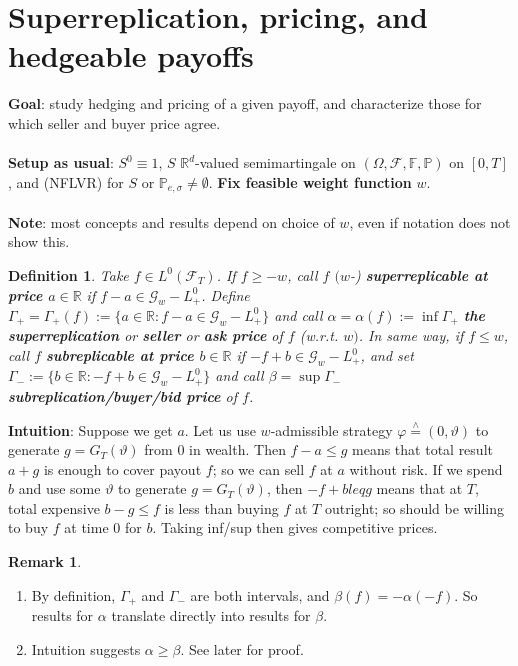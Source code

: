 \documentclass[12pt,a4paper, twoside]{article}
\newtheorem{defn}{Definition}[section]
\theoremstyle{definition}
\newtheorem{rem}{Remark}[section]
\newcommand{\PP}{\mathbb{P}} %
\newcommand{\teq}{\overset{\wedge}{=}}
\begin{document}
\section{Superreplication, pricing, and hedgeable payoffs}
\textbf{Goal}: study hedging and pricing of a given payoff, and characterize those for which seller and buyer price agree. 
\\\\
\textbf{Setup as usual}: $S^0 \equiv 1$, $S$ $\mathbb{R}^d$-valued semimartingale on $( \Omega, \mathcal{F}, \mathbb{F}, \PP)$ on $[0,T]$,  and (NFLVR) for $S$ or $\PP_{e, \sigma} \neq \emptyset$. \textbf{Fix feasible weight function} $w$.
\\\\
\textbf{Note}: most concepts and results depend on choice of $w$, even if notation does not show this. 
\begin{defn} Take $f \in L^0( \mathcal{F}_T)$. If $f \geq -w$, call $f$ $(w$-) \textbf{superreplicable at price $a \in \mathbb{R}$} if $f-a \in \mathcal{G}_w-L_+^0$. Define $\Gamma_+= \Gamma_+(f) := \{ a \in \mathbb{R}: f-a \in \mathcal{G}_w-L_+^0 \}$ and call $\alpha = \alpha(f) := \inf \Gamma_+$ \textbf{the superreplication} or \textbf{seller} or \textbf{ask price} of $f$ (w.r.t. $w)$. In same way, if $f \leq w$, call $f$ \textbf{subreplicable at price $b \in \mathbb{R}$} if $-f + b \in \mathcal{G}_w-L_+^0$, and set $\Gamma_- := \{ b \in \mathbb{R}: -f + b \in \mathcal{G}_w-L_+^0\}$ and call $\beta = \sup \Gamma_-$ \textbf{subreplication/buyer/bid price} of $f$.
\end{defn}
\noindent \textbf{Intuition}: Suppose we get $a$. Let us use $w$-admissible strategy $\varphi \teq (0, \vartheta)$ to generate $g = G_T( \vartheta)$ from $0$ in wealth. Then $f-a \leq g$ means that total result $a+g$ is enough to cover payout $f$; so we can sell $f$ at $a$ without risk. If we spend $b$ and use some $\vartheta$ to generate $g = G_T( \vartheta)$, then $-f+b leq g$ means that at $T$, total expensive $b-g \leq f$ is less than buying $f$ at $T$ outright; so should be willing to buy $f$ at time $0$ for $b$. Taking inf/sup then gives competitive prices. 
\begin{rem} \
\begin{enumerate}
\item By definition, $\Gamma_+$ and $\Gamma_-$ are both intervals, and $\beta(f) = - \alpha(-f)$. So results for $\alpha$ translate directly into results for $\beta$. 
\item Intuition suggests $\alpha \geq \beta$. See later for proof. 
\end{enumerate}
\end{rem}
\end{document}
